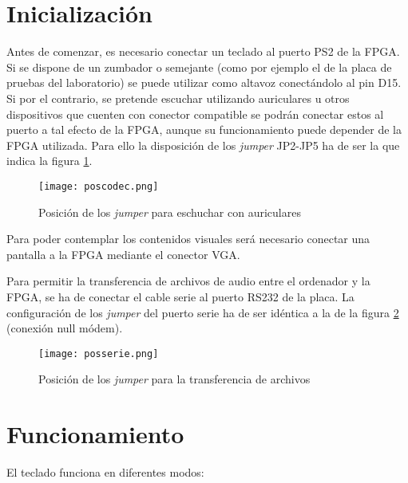 \documentclass{article}
\begin{document}
\section{Inicialización}

	Antes de comenzar, es necesario conectar un teclado al puerto PS2 de la FPGA. Si se dispone de un zumbador o semejante (como por ejemplo el de la placa de pruebas del laboratorio) se puede utilizar como altavoz conectándolo al pin {\color{blue} D15}. Si por el contrario, se pretende escuchar utilizando auriculares u otros dispositivos que cuenten con conector compatible se podrán conectar estos al puerto a tal efecto de la FPGA, aunque su funcionamiento puede depender de la FPGA utilizada. Para ello la disposición de los {\itshape jumper} JP2-JP5 ha de ser la que indica la figura \ref{fig:jump}.

\begin{figure}[ht] \centering
	\texttt{[image: poscodec.png]}

	\caption{Posición de los {\itshape jumper} para eschuchar con auriculares}
	\label{fig:jump}
\end{figure}


	\medskip Para poder contemplar los contenidos visuales será necesario conectar una pantalla a la FPGA mediante el conector VGA.

	\medskip Para permitir la transferencia de archivos de audio entre el ordenador y la FPGA, se ha de conectar el cable serie al puerto RS232 de la placa. La configuración de los {\itshape jumper} del puerto serie ha de ser idéntica a la de la figura \ref{fig:rs232} (conexión null módem).

\begin{figure}[ht] \centering
	\texttt{[image: posserie.png]}

	\caption{Posición de los {\itshape jumper} para la transferencia de archivos}
	\label{fig:rs232}
\end{figure}

\section{Funcionamiento}

	El teclado funciona en diferentes modos:
\end{document}
